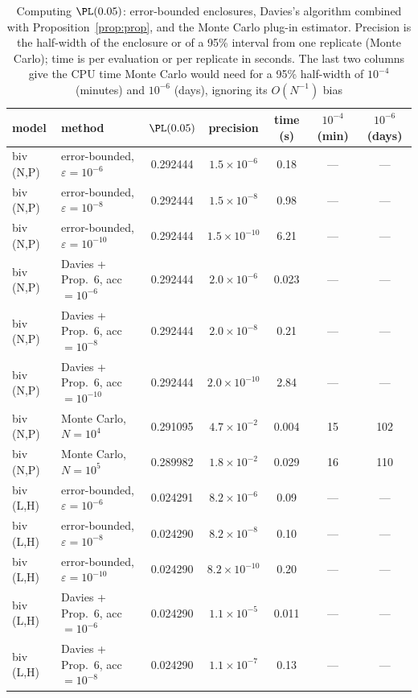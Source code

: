 \begin{table}[t]
\caption{Computing $\PL(0.05)$: error-bounded enclosures, Davies's algorithm combined with Proposition~\ref{prop:prop}, and the Monte Carlo plug-in estimator. Precision is the half-width of the enclosure or of a 95\% interval from one replicate (Monte Carlo); time is per evaluation or per replicate in seconds. The last two columns give the CPU time Monte Carlo would need for a 95\% half-width of $10^{-4}$ (minutes) and $10^{-6}$ (days), ignoring its $O(N^{-1})$ bias}\label{tab:benchpl}
\footnotesize\setlength{\tabcolsep}{2pt}
\begin{tabular*}{\textwidth}{@{\extracolsep\fill}llccccc@{}}
\toprule
model & method & $\PL(0.05)$ & precision & time (s) & $10^{-4}$ (min) & $10^{-6}$ (days)\\
\midrule
biv (N,P) & error-bounded, $\varepsilon=10^{-6}$ & 0.292444 & $1.5\times10^{-6}$ & 0.18 & --- & --- \\
biv (N,P) & error-bounded, $\varepsilon=10^{-8}$ & 0.292444 & $1.5\times10^{-8}$ & 0.98 & --- & --- \\
biv (N,P) & error-bounded, $\varepsilon=10^{-10}$ & 0.292444 & $1.5\times10^{-10}$ & 6.21 & --- & --- \\
biv (N,P) & Davies + Prop.~6, acc $=10^{-6}$ & 0.292444 & $2.0\times10^{-6}$ & 0.023 & --- & --- \\
biv (N,P) & Davies + Prop.~6, acc $=10^{-8}$ & 0.292444 & $2.0\times10^{-8}$ & 0.21 & --- & --- \\
biv (N,P) & Davies + Prop.~6, acc $=10^{-10}$ & 0.292444 & $2.0\times10^{-10}$ & 2.84 & --- & --- \\
biv (N,P) & Monte Carlo, $N=10^{4}$ & 0.291095 & $4.7\times10^{-2}$ & 0.004 & 15 & 102 \\
biv (N,P) & Monte Carlo, $N=10^{5}$ & 0.289982 & $1.8\times10^{-2}$ & 0.029 & 16 & 110 \\
\midrule
biv (L,H) & error-bounded, $\varepsilon=10^{-6}$ & 0.024291 & $8.2\times10^{-6}$ & 0.09 & --- & --- \\
biv (L,H) & error-bounded, $\varepsilon=10^{-8}$ & 0.024290 & $8.2\times10^{-8}$ & 0.10 & --- & --- \\
biv (L,H) & error-bounded, $\varepsilon=10^{-10}$ & 0.024290 & $8.2\times10^{-10}$ & 0.20 & --- & --- \\
biv (L,H) & Davies + Prop.~6, acc $=10^{-6}$ & 0.024290 & $1.1\times10^{-5}$ & 0.011 & --- & --- \\
biv (L,H) & Davies + Prop.~6, acc $=10^{-8}$ & 0.024290 & $1.1\times10^{-7}$ & 0.13 & --- & --- \\

\end{tabular*}
\end{table}
